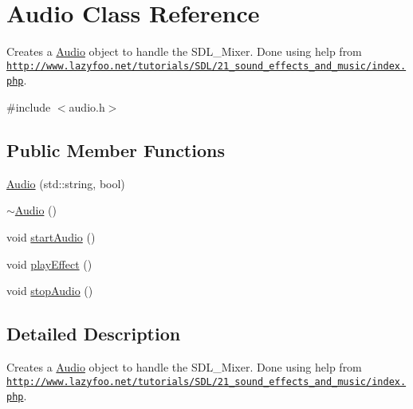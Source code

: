 \hypertarget{class_audio}{\section{Audio Class Reference}
\label{class_audio}
}


Creates a \hyperlink{class_audio}{Audio} object to handle the S\+D\+L\+\_\+\+Mixer. Done using help from \href{http://www.lazyfoo.net/tutorials/SDL/21_sound_effects_and_music/index.php}{\tt http\+://www.\+lazyfoo.\+net/tutorials/\+S\+D\+L/21\+\_\+sound\+\_\+effects\+\_\+and\+\_\+music/index.\+php}.  




{\ttfamily \#include $<$audio.\+h$>$}

\subsection*{Public Member Functions}
\begin{DoxyCompactItemize}
\item 
\hyperlink{class_audio_ae1900ee0e5254fe0c96e0b423ea02777}{Audio} (std\+::string, bool)
\item 
\hyperlink{class_audio_ae8f54deecb5f48511aaab469e80294d6}{$\sim$\+Audio} ()
\item 
void \hyperlink{class_audio_a15f1ea89039f6dbbb2260bb34f9dabdd}{start\+Audio} ()
\item 
void \hyperlink{class_audio_aea41cc6feaed4b1ab5957ea499509f55}{play\+Effect} ()
\item 
void \hyperlink{class_audio_a5d73ae24c80b37df5f167016de9c9296}{stop\+Audio} ()
\end{DoxyCompactItemize}


\subsection{Detailed Description}
Creates a \hyperlink{class_audio}{Audio} object to handle the S\+D\+L\+\_\+\+Mixer. Done using help from \href{http://www.lazyfoo.net/tutorials/SDL/21_sound_effects_and_music/index.php}{\tt http\+://www.\+lazyfoo.\+net/tutorials/\+S\+D\+L/21\+\_\+sound\+\_\+effects\+\_\+and\+\_\+music/index.\+php}. 

